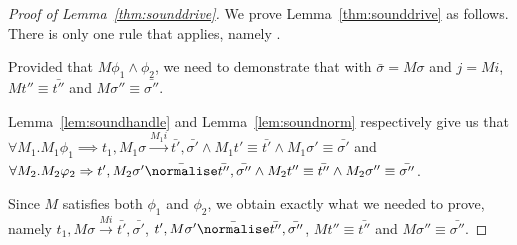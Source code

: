 \begin{proof}[Proof of Lemma~\ref{thm:sounddrive}]
  We prove Lemma~\ref{thm:sounddrive} as follows.
  There is only one rule that applies, namely .

  Provided that $M\phi_1\land\phi_2$, we need to demonstrate that  with $\bar{\sigma}=M\sigma$ and $j=M i$,
  $M t'' \equiv \bar{t''}$ and $M\sigma''\equiv \bar{\sigma''}$.


  Lemma~\ref{lem:soundhandle} and Lemma~\ref{lem:soundnorm} respectively give us that\\
$\forall M_1 . M_1 \phi_1 \implies t_1,M_1\sigma \xrightarrow[]{M_1 i} \bar{t'},\bar{\sigma'}\land M_1 t'\equiv\bar{t'}\land M_1\sigma' \equiv \bar{\sigma'}$ and \\
$\forall M_2 . M_2 \phi_2 \implies t',M_2\sigma' \bar{\normalise} \bar{t''},\bar{\sigma''}\land M_2 t''\equiv\bar{t''}\land M_2\sigma'' \equiv \bar{\sigma''}$.

Since $M$ satisfies both $\phi_1$ and $\phi_2$,
we obtain exactly what we needed to prove,
namely
$t_1,M\sigma \xrightarrow[]{M i} \bar{t'},\bar{\sigma'}$,
$t',M\sigma' \bar{\normalise} \bar{t''},\bar{\sigma''}$,
$M t'' \equiv \bar{t''}$ and $M\sigma''\equiv \bar{\sigma''}$.

\end{proof}
